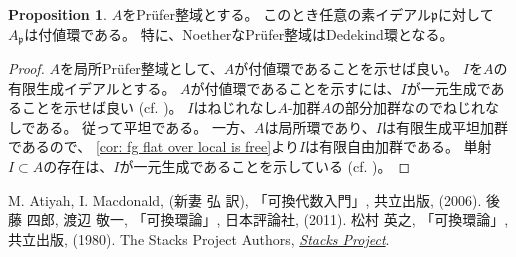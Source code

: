 \documentclass[uplatex]{jsarticle}
\theoremstyle{definition}
\newtheorem{prop}[prop]{Proposition}
\begin{document}
\begin{prop}
  \(A\)をPr\"{u}fer整域とする。
  このとき任意の素イデアル\(\mathfrak{p}\)に対して
  \(A_{\mathfrak{p}}\)は付値環である。
  特に、NoetherなPr\"{u}fer整域はDedekind環となる。
\end{prop}

\begin{proof}
  \(A\)を局所Pr\"{u}fer整域として、\(A\)が付値環であることを示せば良い。
  \(I\)を\(A\)の有限生成イデアルとする。
  \(A\)が付値環であることを示すには、\(I\)が一元生成であることを示せば良い
  (cf. \cite[\href{https://stacks.math.columbia.edu/tag/090Q}{Tag 090Q}]{stacks-project})。
  \(I\)はねじれなし\(A\)-加群\(A\)の部分加群なのでねじれなしである。
  従って平坦である。
  一方、\(A\)は局所環であり、\(I\)は有限生成平坦加群であるので、
  \autoref{cor: fg flat over local is free}より\(I\)は有限自由加群である。
  単射\(I\subset A\)の存在は、\(I\)が一元生成であることを示している
  (cf. \cite[演習2.11]{AM})。
\end{proof}




\begin{thebibliography}{9}
  M. Atiyah, I. Macdonald, (新妻 弘 訳),
  「可換代数入門」, 共立出版, (2006).
  後藤 四郎, 渡辺 敬一,
  「可換環論」, 日本評論社, (2011).
  松村 英之,
  「可換環論」, 共立出版, (1980).
  The Stacks Project Authors,
  \href{https://stacks.math.columbia.edu/}{\textit{Stacks Project}}.
\end{thebibliography}
\end{document}
